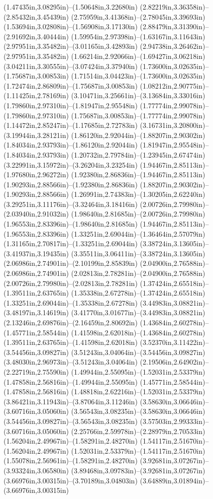 (1.47435in,3.08295in)--(1.50648in,3.22680in) (2.82219in,3.36358in)--(2.85432in,3.45439in) (2.75959in,3.41368in)--(2.78045in,3.39693in) (1.53694in,3.02808in)--(1.56908in,3.17130in) (2.88479in,3.31390in)--(2.91692in,3.40444in) (1.59954in,2.97398in)--(1.63167in,3.11643in) (2.97951in,3.35482in)--(3.01165in,3.42893in) (2.94738in,3.26462in)--(2.97951in,3.35482in) (1.66214in,2.92066in)--(1.69427in,3.06218in) (3.04211in,3.30555in)--(3.07424in,3.37940in) (1.73600in,3.02635in)--(1.75687in,3.00853in) (1.71514in,3.04423in)--(1.73600in,3.02635in) (1.72474in,2.86809in)--(1.75687in,3.00853in) (1.08212in,2.90775in)--(1.11425in,2.78169in) (3.10471in,3.25661in)--(3.13684in,3.33016in) (1.79860in,2.97310in)--(1.81947in,2.95548in) (1.77774in,2.99078in)--(1.79860in,2.97310in) (1.75687in,3.00853in)--(1.77774in,2.99078in) (1.14472in,2.85247in)--(1.17685in,2.72783in) (3.16731in,3.20800in)--(3.19944in,3.28121in) (1.86120in,2.92044in)--(1.88207in,2.90302in) (1.84034in,2.93793in)--(1.86120in,2.92044in) (1.81947in,2.95548in)--(1.84034in,2.93793in) (1.20732in,2.79784in)--(1.23945in,2.67474in) (3.22991in,3.15972in)--(3.26204in,3.23254in) (1.94467in,2.85113in)--(1.97680in,2.96272in) (1.92380in,2.86836in)--(1.94467in,2.85113in) (1.90293in,2.88566in)--(1.92380in,2.86836in) (1.88207in,2.90302in)--(1.90293in,2.88566in) (1.26991in,2.74383in)--(1.30205in,2.62240in) (3.29251in,3.11176in)--(3.32464in,3.18416in) (2.00726in,2.79980in)--(2.03940in,2.91032in) (1.98640in,2.81685in)--(2.00726in,2.79980in) (1.96553in,2.83396in)--(1.98640in,2.81685in) (1.94467in,2.85113in)--(1.96553in,2.83396in) (1.33251in,2.69044in)--(1.36464in,2.57079in) (1.31165in,2.70817in)--(1.33251in,2.69044in) (3.38724in,3.13605in)--(3.41937in,3.19435in) (3.35511in,3.06411in)--(3.38724in,3.13605in) (2.06986in,2.74901in)--(2.10199in,2.85839in) (2.04900in,2.76588in)--(2.06986in,2.74901in) (2.02813in,2.78281in)--(2.04900in,2.76588in) (2.00726in,2.79980in)--(2.02813in,2.78281in) (1.37424in,2.65518in)--(1.39511in,2.63765in) (1.35338in,2.67278in)--(1.37424in,2.65518in) (1.33251in,2.69044in)--(1.35338in,2.67278in) (3.44983in,3.08821in)--(3.48197in,3.14619in) (3.41770in,3.01677in)--(3.44983in,3.08821in) (2.13246in,2.69876in)--(2.16459in,2.80692in) (1.43684in,2.60278in)--(1.45771in,2.58544in) (1.41598in,2.62018in)--(1.43684in,2.60278in) (1.39511in,2.63765in)--(1.41598in,2.62018in) (3.52370in,3.11422in)--(3.54456in,3.09827in) (3.51243in,3.04064in)--(3.54456in,3.09827in) (3.48030in,2.96973in)--(3.51243in,3.04064in) (2.19506in,2.64902in)--(2.22719in,2.75590in) (1.49944in,2.55095in)--(1.52031in,2.53379in) (1.47858in,2.56816in)--(1.49944in,2.55095in) (1.45771in,2.58544in)--(1.47858in,2.56816in) (1.48818in,2.62216in)--(1.52031in,2.53379in) (3.86421in,3.11943in)--(3.87064in,3.11246in) (3.58630in,3.06646in)--(3.60716in,3.05060in) (3.56543in,3.08235in)--(3.58630in,3.06646in) (3.54456in,3.09827in)--(3.56543in,3.08235in) (3.57503in,2.99333in)--(3.60716in,3.05060in) (2.25766in,2.59978in)--(2.28979in,2.70533in) (1.56204in,2.49967in)--(1.58291in,2.48270in) (1.54117in,2.51670in)--(1.56204in,2.49967in) (1.52031in,2.53379in)--(1.54117in,2.51670in) (1.55078in,2.56961in)--(1.58291in,2.48270in) (3.92681in,3.07267in)--(3.93324in,3.06580in) (3.89468in,3.09783in)--(3.92681in,3.07267in) (3.66976in,3.00315in)--(3.70189in,3.04803in) (3.64889in,3.01894in)--(3.66976in,3.00315in) 
